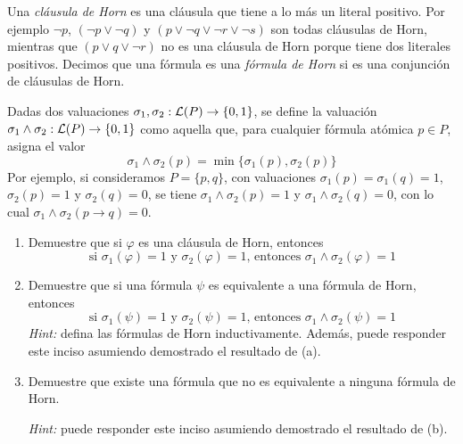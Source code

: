 
Una {\em cláusula de Horn} es una cláusula que tiene a lo más un
literal positivo. Por ejemplo $\neg p$, $(\neg p \vee \neg q)$ y $(p \vee
\neg q \vee \neg r \vee \neg s)$ son todas cláusulas de Horn, mientras
que $(p \vee q \vee \neg r)$ no es una cláusula de Horn porque tiene
dos literales positivos. Decimos que una fórmula es una \textit{fórmula de Horn} si es una conjunción de cláusulas de Horn.\medskip 

Dadas dos valuaciones $\sigma_1,\sigma_2:\mathcal{L}(P)\rightarrow\{0,1\}$, se define la valuación $\sigma_1\wedge\sigma_2:\mathcal{L}(P)\rightarrow\{0,1\}$ como aquella que, para cualquier fórmula atómica $p\in P$, asigna el valor 
    $$\sigma_1\wedge\sigma_2(p)=\min\{\sigma_1(p),\sigma_2(p)\}$$
Por ejemplo, si consideramos $P=\{p,q\}$, con valuaciones $\sigma_1(p)=\sigma_1(q)=1$, $\sigma_2(p)=1$ y $\sigma_2(q)=0$, se tiene $\sigma_1\wedge\sigma_2(p)=1$ y $\sigma_1\wedge\sigma_2(q)=0$, con lo cual $\sigma_1\wedge\sigma_2(p\rightarrow q)=0$.
\begin{enumerate}[label=(\alph*)]
    \item  Demuestre que si $\varphi$ es una cláusula de Horn, entonces
     $$\text{si }\sigma_1(\varphi)=1\text{ y }\sigma_2(\varphi)=1\text{, entonces }\sigma_1\wedge\sigma_2(\varphi)=1$$
     \item Demuestre que si una fórmula $\psi$ es equivalente a una fórmula de Horn, entonces
     $$\text{si }\sigma_1(\psi)=1\text{ y }\sigma_2(\psi)=1\text{, entonces }\sigma_1\wedge\sigma_2(\psi)=1$$
     \textit{Hint:} defina las fórmulas de Horn inductivamente. Además, puede responder este inciso asumiendo demostrado el resultado de (a).
     \item Demuestre que existe una fórmula que no es equivalente a ninguna fórmula de Horn. 
     
     \textit{Hint:} puede responder este inciso asumiendo demostrado el resultado de (b).
\end{enumerate}

